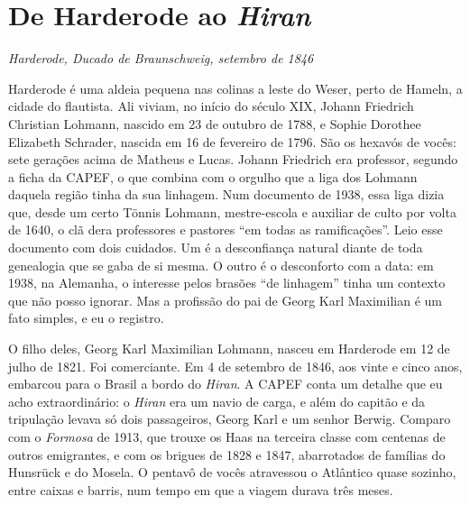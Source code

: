 \documentclass[
  brazilian,
  11pt,
  openany]{book}
\begin{document}
\section{\texorpdfstring{De Harderode ao
\emph{Hiran}}{De Harderode ao Hiran}}\label{de-harderode-ao-hiran}

\emph{Harderode, Ducado de Braunschweig, setembro de 1846}

Harderode é uma aldeia pequena nas colinas a leste do Weser, perto de
Hameln, a cidade do flautista. Ali viviam, no início do século XIX,
Johann Friedrich Christian Lohmann, nascido em 23 de outubro de 1788, e
Sophie Dorothee Elizabeth Schrader, nascida em 16 de fevereiro de 1796.
São os hexavós de vocês: sete gerações acima de Matheus e Lucas. Johann
Friedrich era professor, segundo a ficha da CAPEF, o que combina com o
orgulho que a liga dos Lohmann daquela região tinha da sua linhagem. Num
documento de 1938, essa liga dizia que, desde um certo Tönnis Lohmann,
mestre-escola e auxiliar de culto por volta de 1640, o clã dera
professores e pastores ``em todas as ramificações''. Leio esse documento
com dois cuidados. Um é a desconfiança natural diante de toda genealogia
que se gaba de si mesma. O outro é o desconforto com a data: em 1938, na
Alemanha, o interesse pelos brasões ``de linhagem'' tinha um contexto
que não posso ignorar. Mas a profissão do pai de Georg Karl Maximilian é
um fato simples, e eu o registro.

O filho deles, Georg Karl Maximilian Lohmann, nasceu em Harderode em 12
de julho de 1821. Foi comerciante. Em 4 de setembro de 1846, aos vinte e
cinco anos, embarcou para o Brasil a bordo do \emph{Hiran}. A CAPEF
conta um detalhe que eu acho extraordinário: o \emph{Hiran} era um navio
de carga, e além do capitão e da tripulação levava só dois passageiros,
Georg Karl e um senhor Berwig. Comparo com o \emph{Formosa} de 1913, que
trouxe os Haas na terceira classe com centenas de outros emigrantes, e
com os brigues de 1828 e 1847, abarrotados de famílias do Hunsrück e do
Mosela. O pentavô de vocês atravessou o Atlântico quase sozinho, entre
caixas e barris, num tempo em que a viagem durava três meses.
\end{document}
